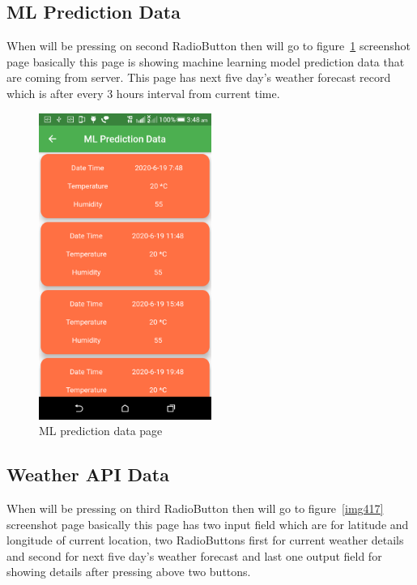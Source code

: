 \subsection{ML Prediction Data}
When will be pressing on second RadioButton then will go to figure~\ref{img416} screenshot page basically this page is showing machine learning model prediction data that are coming from server. This page has next five day's weather forecast record which is after every 3 hours interval from current time. 

\begin{figure}[!ht]
\centering
\includegraphics[height=10cm]{figures/ml-data.png}
\caption{\label{img416} ML prediction data page}
\end{figure}

\subsection{Weather API Data}
When will be pressing on third RadioButton then will go to figure~\ref{img417} screenshot page basically this page has two input field which are for latitude and longitude of current location, two RadioButtons first for current weather details and second for next five day's weather forecast and last one output field for showing details after pressing above two buttons.

